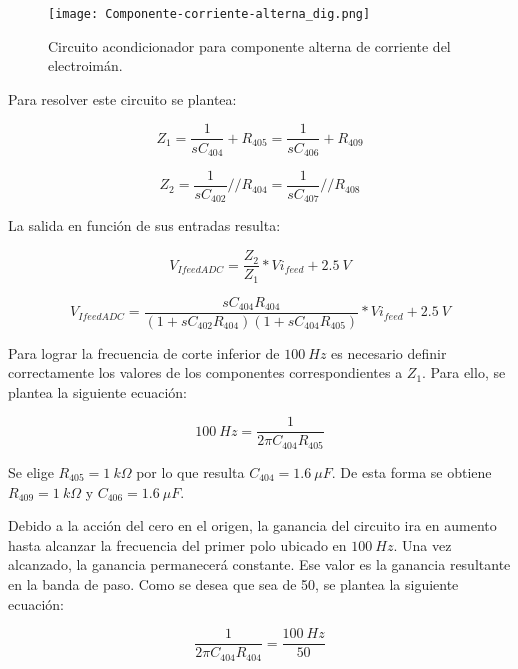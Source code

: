 \begin{figure}[H]
	\centering
	\texttt{[image: Componente-corriente-alterna\_dig.png]}
	\caption{ Circuito acondicionador para componente alterna de corriente del electroimán.
	}
	\label{fig:componente-corriente-alterna}
\end{figure}

Para resolver este circuito se plantea:

\begin{equation*} 
	Z_1=\frac{1}{sC_{404}}+R_{405}=\frac{1}{sC_{406}}+R_{409}
\end{equation*}

\begin{equation*} 
	Z_2=\frac{1}{sC_{402}}//R_{404}=\frac{1}{sC_{407}}//R_{408}
\end{equation*}

La salida en función de sus entradas resulta:

\begin{equation*} 
	V_{IfeedADC} =\frac{Z_2}{Z_1}*Vi_{feed}+2.5\:V
\end{equation*}

\begin{equation*} 
	V_{IfeedADC} =\frac{sC_{404}R_{404}}{(1+sC_{402}R_{404})(1+sC_{404}R_{405})}*Vi_{feed}+2.5\:V
\end{equation*}

Para lograr la frecuencia de corte inferior de $100\:Hz$ es necesario definir correctamente los valores de los componentes correspondientes a $Z_1$. Para ello, se plantea la siguiente ecuación:

\begin{equation*} 
	100\:Hz=\frac{1}{2\pi C_{404}R_{405}}
\end{equation*}

Se elige $R_{405}=1\:k\Omega$ por lo que resulta $C_{404}=1.6\:\mu F$. De esta forma se obtiene $R_{409}=1\:k\Omega$ y $C_{406}=1.6\:\mu F$.

Debido a la acción del cero en el origen, la ganancia del circuito ira en aumento hasta alcanzar la frecuencia del primer polo ubicado en $100\:Hz$. Una vez alcanzado, la ganancia permanecerá constante. Ese valor es la ganancia resultante en la banda de paso. Como se desea que sea de 50, se plantea la siguiente ecuación:

\begin{equation*} 
	\frac{1}{2\pi C_{404}R_{404}}=\frac{100\:Hz}{50}
\end{equation*}

